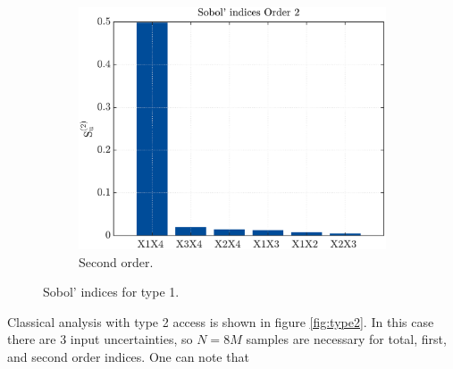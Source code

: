 \documentclass{elsarticle}
\begin{document}
\begin{figure}[hbtp]
\begin{subfigure}[b]{.49\textwidth}
	\centering
	\includegraphics[width=\textwidth]{figures/second_type1.pdf}
	\caption{Second order.\label{fig:second_type1}}
	\end{subfigure}
	\caption{Sobol' indices for type 1.\label{fig:type1}}
\end{figure}

Classical analysis with type 2 access is shown in figure \ref{fig:type2}. In this case there are 3 input uncertainties, so $N=8M$ samples are necessary for total, first, and second order indices. One can note that 
\end{document}
